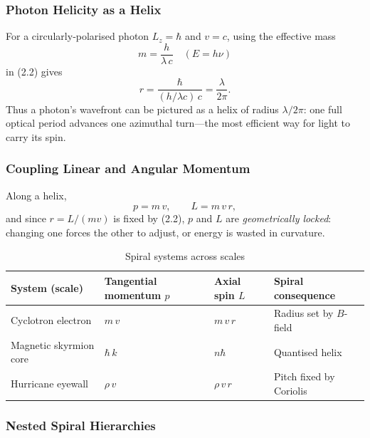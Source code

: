 \subsubsection{Photon Helicity as a Helix}

For a circularly‐polarised photon \(L_z=\hbar\) and \(v=c\), using the effective mass
\[
  m = \frac{h}{\lambda\,c}
  \quad(E = h\nu)
\]
in (2.2) gives
\[
  r = \frac{\hbar}{(h/\lambda c)\,c}
     = \frac{\lambda}{2\pi}.
\]
Thus a photon’s wavefront can be pictured as a helix of radius \(\lambda/2\pi\): one full optical period advances one azimuthal turn—the most efficient way for light to carry its spin.

\subsubsection{Coupling Linear and Angular Momentum}

Along a helix,
\[
  p = m\,v,
  \qquad
  L = m\,v\,r,
\]
and since \(r=L/(mv)\) is fixed by (2.2), \(p\) and \(L\) are \emph{geometrically locked}: changing one forces the other to adjust, or energy is wasted in curvature.

\bigskip
\begin{table}[H]
  \small
  \centering
  \caption{Spiral systems across scales}
  \label{tab:spiral-systems}
  \begin{tabular}{@{}p{} p{} p{} p{}@{}}
    \toprule
    \textbf{System (scale)} & \textbf{Tangential momentum \(p\)} & \textbf{Axial spin \(L\)} & \textbf{Spiral consequence} \\
    \midrule
    Cyclotron electron     & \(m\,v\)                     & \(m\,v\,r\)           & Radius set by \(B\)-field \\
    Magnetic skyrmion core & \(\hbar\,k\)                 & \(n\hbar\)            & Quantised helix \\
    Hurricane eyewall      & \(\rho\,v\)                  & \(\rho\,v\,r\)        & Pitch fixed by Coriolis \\
    \bottomrule
  \end{tabular}
\end{table}

\bigskip

\subsubsection{Nested Spiral Hierarchies}

